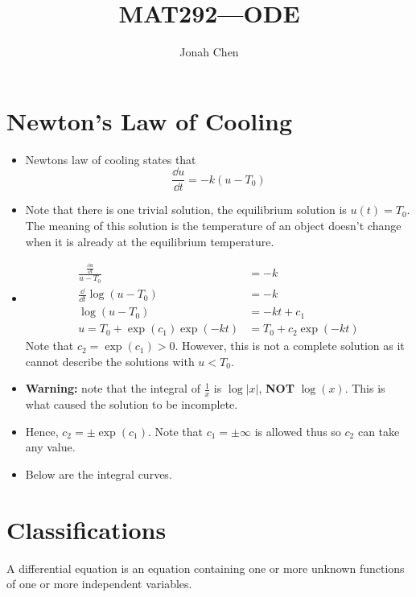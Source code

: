 \documentclass[a4paper, 10pt]{article}
\title{MAT292---ODE}
\author{Jonah Chen}
\numberwithin{equation}{section}
\begin{document}
\maketitle
\tableofcontents

\section{Newton's Law of Cooling}
\begin{itemize}
    \item Newtons law of cooling states that
    \begin{equation}
        \frac{\dd u}{\dd t}=-k(u-T_0)
    \end{equation}
    \item Note that there is one trivial solution, the equilibrium solution is $u(t)=T_0$. The meaning of this solution is the temperature of an object doesn't change when it is already at the equilibrium temperature.
    \item \begin{align}
        \frac{\frac{\dd u}{\dd t}}{u-T_0}&=-k\\
        \frac{\dd}{\dd t}\log(u-T_0)&=-k\\
        \log(u-T_0)&=-kt+c_1\\
        u=T_0+\exp(c_1)\exp(-kt)&=T_0+c_2\exp(-kt)
    \end{align}
    Note that $c_2=\exp(c_1)>0$. However, this is not a complete solution as it cannot describe the solutions with $u<T_0$.
    \item \textbf{Warning:} note that the integral of $\frac{1}{x}$ is $\log|x|$, \textbf{NOT} $\log(x)$. This is what caused the solution to be incomplete.
    \item Hence, $c_2=\pm\exp(c_1)$. Note that $c_1=\pm\infty$ is allowed thus so $c_2$ can take any value.
    \item Below are the integral curves.
\end{itemize}

\section{Classifications}
\begin{definition}
    A differential equation is an equation containing one or more unknown functions of one or more independent variables.
\end{definition}
\end{document}
